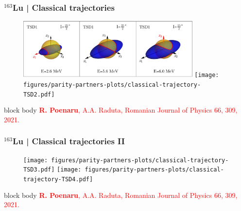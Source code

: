 \documentclass{beamer}
\begin{document}
\begin{frame}
	\frametitle{$^{163}$Lu | Classical trajectories}
	\vspace{-0.5cm}
	\begin{figure}
		\centering
		\includegraphics[width=0.82\textwidth]{figures/parity-partners-plots/classical-trajectory-TSD1.pdf}
		\texttt{[image: figures/parity-partners-plots/classical-trajectory-TSD2.pdf]}
	\end{figure}
	\begin{beamercolorbox}[rounded=true,shadow=false, wd=\linewidth,]{block body}
		\centering
		\textcolor{red}{\footnotesize{\textbf{R. Poenaru}, A.A. Raduta, Romanian Journal of Physics 66, 309, 2021.}}
	\end{beamercolorbox}
\end{frame}

\begin{frame}
	\frametitle{$^{163}$Lu | Classical trajectories II}
	\vspace{-0.5cm}
	\begin{figure}
		\centering
		\texttt{[image: figures/parity-partners-plots/classical-trajectory-TSD3.pdf]}
		\texttt{[image: figures/parity-partners-plots/classical-trajectory-TSD4.pdf]}
	\end{figure}
	\begin{beamercolorbox}[rounded=true,shadow=false, wd=\linewidth,]{block body}
		\centering
		\textcolor{red}{\footnotesize{\textbf{R. Poenaru}, A.A. Raduta, Romanian Journal of Physics 66, 309, 2021.}}
	\end{beamercolorbox}
\end{frame}
\end{document}

